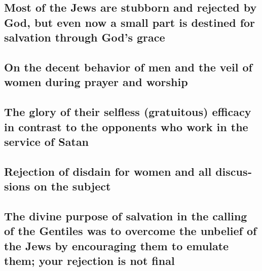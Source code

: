 \begin{paracol}{2}
\begin{otherlanguage}{english}
\hypertarget{most-of-the-jews-are-stubborn-and-rejected-by-god-but-even-now-a-small-part-is-destined-for-salvation-through-gods-grace}{%
\subsection{Most of the Jews are stubborn and rejected by God, but even
now a small part is destined for salvation through God's
grace}\label{most-of-the-jews-are-stubborn-and-rejected-by-god-but-even-now-a-small-part-is-destined-for-salvation-through-gods-grace}}

\hypertarget{on-the-decent-behavior-of-men-and-the-veil-of-women-during-prayer-and-worship}{%
\subsection{On the decent behavior of men and the veil of women during
prayer and
worship}\label{on-the-decent-behavior-of-men-and-the-veil-of-women-during-prayer-and-worship}}

\hypertarget{the-glory-of-their-selfless-gratuitous-efficacy-in-contrast-to-the-opponents-who-work-in-the-service-of-satan}{%
\subsection{The glory of their selfless (gratuitous) efficacy in
contrast to the opponents who work in the service of
Satan}\label{the-glory-of-their-selfless-gratuitous-efficacy-in-contrast-to-the-opponents-who-work-in-the-service-of-satan}}

\hypertarget{rejection-of-disdain-for-women-and-all-discussions-on-the-subject}{%
\subsection{Rejection of disdain for women and all discussions on the
subject}\label{rejection-of-disdain-for-women-and-all-discussions-on-the-subject}}

\hypertarget{the-divine-purpose-of-salvation-in-the-calling-of-the-gentiles-was-to-overcome-the-unbelief-of-the-jews-by-encouraging-them-to-emulate-them-your-rejection-is-not-final}{%
\subsection{The divine purpose of salvation in the calling of the
Gentiles was to overcome the unbelief of the Jews by encouraging them to
emulate them; your rejection is not
final}\label{the-divine-purpose-of-salvation-in-the-calling-of-the-gentiles-was-to-overcome-the-unbelief-of-the-jews-by-encouraging-them-to-emulate-them-your-rejection-is-not-final}}


\end{otherlanguage}
\end{paracol}
